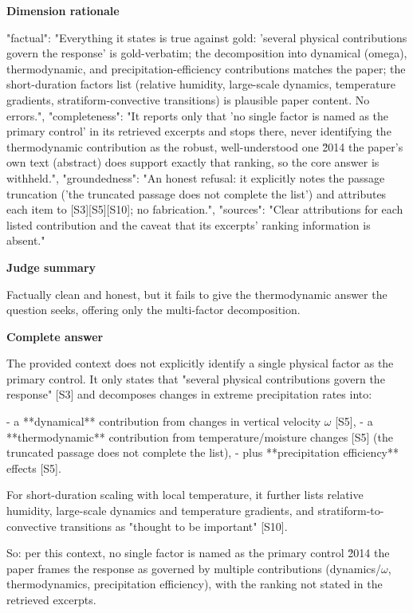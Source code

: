 \documentclass[10pt]{article}
\begin{document}
\textbf{Dimension rationale}
\begin{EvidenceText}
{
  "factual": "Everything it states is true against gold: 'several physical contributions govern the response' is gold-verbatim; the decomposition into dynamical (omega), thermodynamic, and precipitation-efficiency contributions matches the paper; the short-duration factors list (relative humidity, large-scale dynamics, temperature gradients, stratiform-convective transitions) is plausible paper content. No errors.",
  "completeness": "It reports only that 'no single factor is named as the primary control' in its retrieved excerpts and stops there, never identifying the thermodynamic contribution as the robust, well-understood one \u2014 the paper's own text (abstract) does support exactly that ranking, so the core answer is withheld.",
  "groundedness": "An honest refusal: it explicitly notes the passage truncation ('the truncated passage does not complete the list') and attributes each item to [S3][S5][S10]; no fabrication.",
  "sources": "Clear attributions for each listed contribution and the caveat that its excerpts' ranking information is absent."
}
\end{EvidenceText}

\textbf{Judge summary}
\begin{EvidenceText}
Factually clean and honest, but it fails to give the thermodynamic answer the question seeks, offering only the multi-factor decomposition.
\end{EvidenceText}

\textbf{Complete answer}
\begin{AnswerText}
The provided context does not explicitly identify a single physical factor as the primary control. It only states that "several physical contributions govern the response" [S3] and decomposes changes in extreme precipitation rates into:

- a **dynamical** contribution from changes in vertical velocity $\omega$ [S5],
- a **thermodynamic** contribution from temperature/moisture changes [S5] (the truncated passage does not complete the list),
- plus **precipitation efficiency** effects [S5].

For short-duration scaling with local temperature, it further lists relative humidity, large-scale dynamics and temperature gradients, and stratiform-to-convective transitions as "thought to be important" [S10].

So: per this context, no single factor is named as the primary control \u2014 the paper frames the response as governed by multiple contributions (dynamics/$\omega$, thermodynamics, precipitation efficiency), with the ranking not stated in the retrieved excerpts.
\end{AnswerText}
\end{document}

